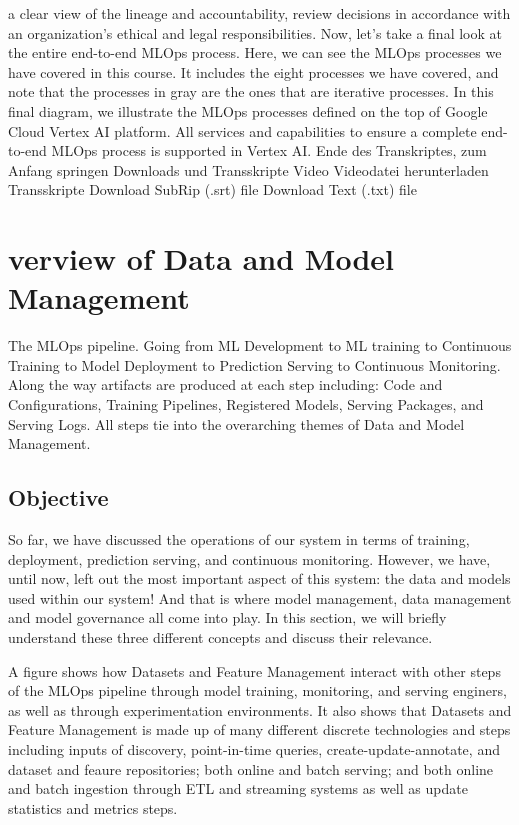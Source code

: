 {{{{{{{{    a clear view of the lineage and accountability,
    review decisions in accordance with an organization's ethical and legal
    responsibilities.
    Now, let's take a final look at the entire end-to-end MLOps process.
    Here, we can see the MLOps processes we have covered in this course.
    It includes the eight processes we have covered,
    and note that the processes in gray are the ones that are iterative processes.
    In this final diagram, we illustrate the MLOps
    processes defined on the top of Google Cloud Vertex AI platform.
    All services and capabilities to ensure a complete end-to-end MLOps process
    is supported in Vertex AI.
    Ende des Transkriptes, zum Anfang springen
    Downloads und Transskripte
    Video
    Videodatei herunterladen
    Transskripte
    Download SubRip (.srt) file
    Download Text (.txt) file        
  
\section{verview of Data and Model Management}

    
    The MLOps pipeline. Going from ML Development to ML training to Continuous Training to Model Deployment to Prediction Serving to Continuous Monitoring. Along the way artifacts are produced at each step including: Code and Configurations, Training Pipelines, Registered Models, Serving Packages, and Serving Logs. All steps tie into the overarching themes of Data and Model Management.
    
   \subsection{Objective}
    So far, we have discussed the operations of our system in terms of training, deployment, prediction serving, and continuous monitoring. However, we have, until now, left out the most important aspect of this system: the data and models used within our system! And that is where model management, data management and model governance all come into play. In this section, we will briefly understand these three different concepts and discuss their relevance.

    
    A figure shows how Datasets and Feature Management interact with other steps of the MLOps pipeline through model training, monitoring, and serving enginers, as well as through experimentation environments. It also shows that Datasets and Feature Management is made up of many different discrete technologies and steps including inputs of discovery, point-in-time queries, create-update-annotate, and dataset and feaure repositories; both online and batch serving; and both online and batch ingestion through ETL and streaming systems as well as update statistics and metrics steps.
    
}}}}}}}}
